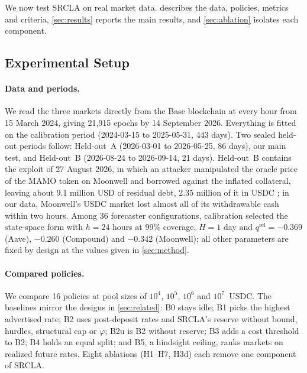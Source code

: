 \documentclass[sigconf]{acmart}
\begin{document}
We now test SRCLA on real market data.  describes the data, policies, metrics and criteria, \cref{sec:results} reports the main results, and \cref{sec:ablation} isolates each component.

\subsection{Experimental Setup}
\label{sec:setup}

\paragraph{Data and periods.}
We read the three markets directly from the Base blockchain at every hour from 15 March 2024, giving 21,915 epochs by 14 September 2026. Everything is fitted on the calibration period (2024-03-15 to 2025-05-31, 443 days). Two sealed held-out periods follow: Held-out~A (2026-03-01 to 2026-05-25, 86 days), our main test, and Held-out~B (2026-08-24 to 2026-09-14, 21 days). Held-out~B contains the exploit of 27 August 2026, in which an attacker manipulated the oracle price of the MAMO token on Moonwell and borrowed against the inflated collateral, leaving about 9.1 million USD of residual debt, 2.35 million of it in USDC \citep{moonwellpostmortem}; in our data, Moonwell's USDC market lost almost all of its withdrawable cash within two hours. Among 36 forecaster configurations, calibration selected the state-space form with $h = 24$ hours at 99\% coverage, $H = 1$ day and $q^{\mathrm{rel}} = -0.369$ (Aave), $-0.260$ (Compound) and $-0.342$ (Moonwell); all other parameters are fixed by design at the values given in \cref{sec:method}.

\paragraph{Compared policies.}
We compare 16 policies at pool sizes of $10^4$, $10^5$, $10^6$ and $10^7$~USDC. The baselines mirror the designs in \cref{sec:related}: B0 stays idle; B1 picks the highest advertised rate; B2 uses post-deposit rates and SRCLA's reserve without bound, hurdles, structural cap or $\varphi$; B2u is B2 without reserve; B3 adds a cost threshold to B2; B4 holds an equal split; and B5, a hindsight ceiling, ranks markets on realized future rates. Eight ablations (H1--H7, H3d) each remove one component of SRCLA.
\end{document}

